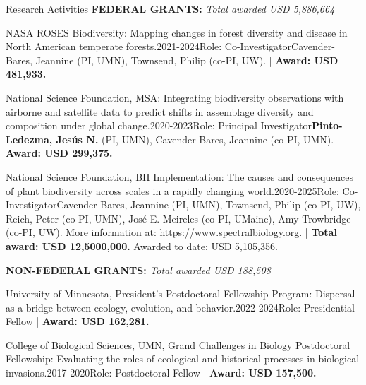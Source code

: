 \documentclass{resume} %
\begin{document}

\begin{rSection}{Research Activities}
\textbf{FEDERAL GRANTS:} \hfill {\em Total awarded USD 5,886,664}

\begin{pSubsection}{NASA ROSES Biodiversity: }{Mapping changes in forest diversity and disease in North American temperate forests.}{2021-2024}{Role: Co-Investigator}{Cavender-Bares, Jeannine (PI, UMN), Townsend, Philip (co-PI, UW). | {\bf Award: USD 481,933.}}
\end{pSubsection}

\begin{pSubsection}{National Science Foundation, MSA: }{Integrating biodiversity observations with airborne and satellite data to predict shifts in assemblage diversity and composition under global change.}{2020-2023}{Role: Principal Investigator}{}{{\bf Pinto-Ledezma, Jesús N.} (PI, UMN), Cavender-Bares, Jeannine (co-PI, UMN). | {\bf Award: USD 299,375.}}
\end{pSubsection}

\begin{pSubsection}{National Science Foundation, BII Implementation: }{The causes and consequences of plant biodiversity across scales in a rapidly changing world.}{2020-2025}{Role: Co-Investigator}{Cavender-Bares, Jeannine (PI, UMN), Townsend, Philip (co-PI, UW), Reich, Peter (co-PI, UMN), José E. Meireles (co-PI, UMaine), Amy Trowbridge (co-PI, UW). More information at: \url{https://www.spectralbiology.org}. | {\bf Total award: USD 12,5000,000.} Awarded to date: USD 5,105,356.}
\end{pSubsection}

\textbf{NON-FEDERAL GRANTS:}  \hfill {\em Total awarded USD 188,508}

\begin{pSubsection}{University of Minnesota, President's Postdoctoral Fellowship Program: }{Dispersal as a bridge between ecology, evolution, and behavior.}{2022-2024}{Role: Presidential Fellow}{ | {\bf Award: USD 162,281.}}
\end{pSubsection}

\begin{pSubsection}{College of Biological Sciences, UMN, Grand Challenges in Biology Postdoctoral Fellowship: }{Evaluating the roles of ecological and historical processes in biological invasions.}{2017-2020}{Role: Postdoctoral Fellow}{ | {\bf Award: USD 157,500.}}
\end{pSubsection}


\end{rSection}
\end{document}

